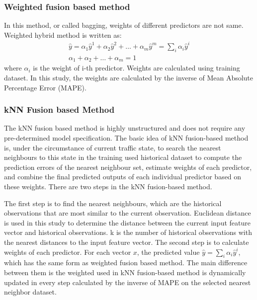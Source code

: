 \documentclass[sigconf]{acmart}
\begin{document}
  \subsubsection{Weighted fusion based method}
  In this method, or called bagging, weights of different predictors are not same. Weighted hybrid method is written as:
  \begin{equation}
    \begin{array}{c}{\hat{y}=\alpha_{1} \hat{y}^{1}+\alpha_{2} \hat{y}^{2}+\ldots+\alpha_{m} \hat{y}^{m}=\sum_{i} \alpha_{i} \hat{y}^{i}} \\ {\alpha_{1}+\alpha_{2}+\ldots+\alpha_{m}=1}\end{array}
  \end{equation}
  where $\alpha_{i}$ is the weight of i-th predictor. Weights are calculated using training dataset. In this study, the weights are calculated by the inverse of Mean Absolute Percentage Error (MAPE).
  \subsubsection{kNN Fusion based Method}
  The kNN fusion based method is highly unstructured and does not require any pre-determined model specification. The basic idea of kNN fusion-based method is, under the circumstance of current traffic state, to search the nearest neighbours to this state in the training used historical dataset to compute the prediction errors of the nearest neighbour set, estimate weights of each predictor, and combine the final predicted outputs of each individual predictor based on these weights\cite{guo2018predictor}.
  There are two steps in the kNN fusion-based method.
  
  The first step is to find the nearest neighbours, which are the historical observations that are most similar to the current observation. Euclidean distance is used in this study to determine the distance between the current input feature vector and historical observations. k is the number of historical observations with the nearest distances to the input feature vector.
  The second step is to calculate weights of each predictor.
  For each vector $x$, the predicted value ${\hat{y}=\sum_{i} \alpha_{i} \hat{y}^{i}}$, which has the same form as weighted fusion based method.
  The main difference between them is the weighted used in kNN fusion-based method is dynamically updated in every step calculated by the inverse of MAPE on the selected nearest neighbor dataset.
\end{document}
